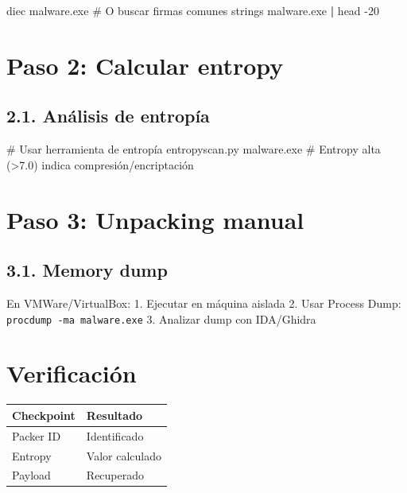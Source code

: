 \documentclass[
  letterpaper,
]{report}
\newenvironment{Shaded}{\begin{snugshade}}{\end{snugshade}}
\newcommand{\AttributeTok}[1]{\textcolor[rgb]{0.40,0.45,0.13}{#1}}
\newcommand{\CommentTok}[1]{\textcolor[rgb]{0.37,0.37,0.37}{#1}}
\newcommand{\ExtensionTok}[1]{\textcolor[rgb]{0.00,0.23,0.31}{#1}}
\newcommand{\FunctionTok}[1]{\textcolor[rgb]{0.28,0.35,0.67}{#1}}
\newcommand{\KeywordTok}[1]{\textcolor[rgb]{0.00,0.23,0.31}{\textbf{#1}}}
\newcommand{\NormalTok}[1]{\textcolor[rgb]{0.00,0.23,0.31}{#1}}
\newcounter{none} %
\begin{document}
\begin{Shaded}
\begin{Highlighting}[]
\ExtensionTok{diec}\NormalTok{ malware.exe}
\CommentTok{\# O buscar firmas comunes}
\FunctionTok{strings}\NormalTok{ malware.exe }\KeywordTok{|} \FunctionTok{head} \AttributeTok{{-}20}
\end{Highlighting}
\end{Shaded}

\section{Paso 2: Calcular entropy}\label{paso-2-calcular-entropy}

\subsection{2.1. Análisis de entropía}\label{anuxe1lisis-de-entropuxeda}

\begin{Shaded}
\begin{Highlighting}[]
\CommentTok{\# Usar herramienta de entropía}
\ExtensionTok{entropyscan.py}\NormalTok{ malware.exe}
\CommentTok{\# Entropy alta (\textgreater{}7.0) indica compresión/encriptación}
\end{Highlighting}
\end{Shaded}

\section{Paso 3: Unpacking manual}\label{paso-3-unpacking-manual}

\subsection{3.1. Memory dump}\label{memory-dump}

En VMWare/VirtualBox: 1. Ejecutar en máquina aislada 2. Usar Process
Dump: \texttt{procdump\ -ma\ malware.exe} 3. Analizar dump con
IDA/Ghidra

\section{Verificación}\label{verificaciuxf3n-5}

{\def\LTcaptype{none} %
\begin{longtable}[]{@{}ll@{}}
\toprule\noalign{}
Checkpoint & Resultado \\
\midrule\noalign{}
\endhead
\bottomrule\noalign{}
\endlastfoot
Packer ID & Identificado \\
Entropy & Valor calculado \\
Payload & Recuperado \\
\end{longtable}
}
\end{document}
